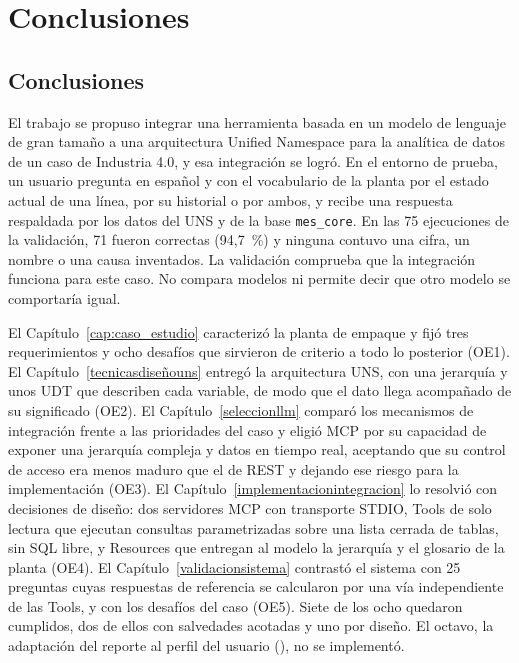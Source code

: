 \section{Conclusiones}
\label{conclusiones}

\subsection{Conclusiones}

El trabajo se propuso integrar una herramienta basada en un modelo de lenguaje de gran tamaño a una arquitectura Unified Namespace para la analítica de datos de un caso de Industria 4.0, y esa integración se logró. En el entorno de prueba, un usuario pregunta en español y con el vocabulario de la planta por el estado actual de una línea, por su historial o por ambos, y recibe una respuesta respaldada por los datos del UNS y de la base \texttt{mes\_core}. En las 75 ejecuciones de la validación, 71 fueron correctas (94,7~\%) y ninguna contuvo una cifra, un nombre o una causa inventados. La validación comprueba que la integración funciona para este caso. No compara modelos ni permite decir que otro modelo se comportaría igual.

El Capítulo~\ref{cap:caso_estudio} caracterizó la planta de empaque y fijó tres requerimientos y ocho desafíos que sirvieron de criterio a todo lo posterior (OE1). El Capítulo~\ref{tecnicasdiseñouns} entregó la arquitectura UNS, con una jerarquía y unos UDT que describen cada variable, de modo que el dato llega acompañado de su significado (OE2). El Capítulo~\ref{seleccionllm} comparó los mecanismos de integración frente a las prioridades del caso y eligió MCP por su capacidad de exponer una jerarquía compleja y datos en tiempo real, aceptando que su control de acceso era menos maduro que el de REST y dejando ese riesgo para la implementación (OE3). El Capítulo~\ref{implementacionintegracion} lo resolvió con decisiones de diseño: dos servidores MCP con transporte STDIO, Tools de solo lectura que ejecutan consultas parametrizadas sobre una lista cerrada de tablas, sin SQL libre, y Resources que entregan al modelo la jerarquía y el glosario de la planta (OE4). El Capítulo~\ref{validacionsistema} contrastó el sistema con 25 preguntas cuyas respuestas de referencia se calcularon por una vía independiente de las Tools, y con los desafíos del caso (OE5). Siete de los ocho quedaron cumplidos, dos de ellos con salvedades acotadas y uno por diseño. El octavo, la adaptación del reporte al perfil del usuario (), no se implementó.

